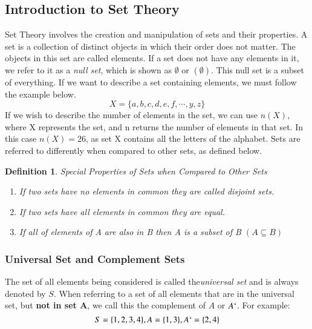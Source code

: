 \documentclass[final,1p,12pt]{elsarticle}
\newtheorem{definition}{Definition}
\begin{document}
    \subsection{Introduction to Set Theory}
    Set Theory involves the creation and manipulation of sets and their properties. A set is a collection of distinct objects in which their order does not matter. The objects in this set are called elements. If a set does not have any elements in it, we refer to it as a \emph{null set}, which is shown as $\emptyset$ or $(\emptyset)$. This null set is a subset of everything. If we want to describe a set containing elements, we must follow the example below.
    \begin{equation}
        X = \{a,b,c,d,e,f,\cdots,y,z\}
    \end{equation}
    If we wish to describe the number of elements in the set, we can use $n(X)$, where X represents the set, and n returns the number of elements in that set. In this case $n(X) = 26$, as set X contains all the letters of the alphabet. Sets are referred to differently when compared to other sets, as defined below.
    \begin{definition}
    Special Properties of Sets when Compared to Other Sets
    \begin{enumerate}
        \item If two sets have no elements in common they are called disjoint sets.
        \item If two sets have all elements in common they are equal.
        \item If all of elements of A are also in B then A is a subset of B $(A\subseteq B)$
    \end{enumerate}
    \end{definition}
    
        \subsubsection{Universal Set and Complement Sets}
        The set of all elements being considered is called the\emph{universal set} and is always denoted by $S$. When referring to a set of all elements that are in the universal set, but\textbf{ not in set A}, we call this the complement of $A$ or $A`$. For example:
        \begin{equation}
            S = \{1,2,3,4\}, A = \{1,3\}, A`=\{2,4\}
        \end{equation}
        
\end{document}
